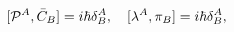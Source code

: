 \begin{equation}\label{6.1}
[{\cal P}^A,\bar{C}_B]=i\hbar\delta^A_B,\quad
[\lambda^A,\pi_B]=i\hbar\delta^A_B,
\end{equation}

